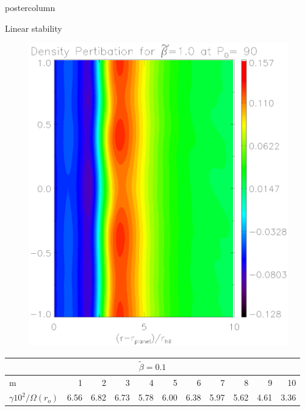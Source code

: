 \documentclass[final,hyperref={pdfpagelabels=false}]{beamer}
\begin{document}
\begin{frame}
\begin{columns}
\begin{column}{.49\textwidth}
\begin{beamercolorbox}[center,wd=\textwidth]{postercolumn}
\begin{minipage}[T]{.95\textwidth}
{\begin{block}{{\Large Linear stability}}
\begin{figure}
\begin{minipage}{0.45\textwidth}
                      \includegraphics[width=\textwidth]{Posterfig_medb}
                    \end{minipage}
                    \hfill
                  \end{figure}

                   \begin{table}
                     \hfill
                     \begin{minipage}{\textwidth}
                       \begin{tabularx}{\textwidth}{l*{10}{R}} %
                          \\ \midrule
                         m                    & 1 & 2 & 3 & 4 & 5 & 6 & 7 & 8 & 9 & 10  \\ 
                         $\gamma10^2/\Omega(r_o)$ & 6.56 & 6.82 & 6.73 & 5.78 & 6.00 & 6.38 & 5.97 & 5.62 & 4.61 & 3.36   \\ \bottomrule
                       \end{tabularx}
                     \end{minipage}


\end{table}
\end{block}}
\end{minipage}
\end{beamercolorbox}
\end{column}
\end{columns}
\end{frame}
\end{document}
